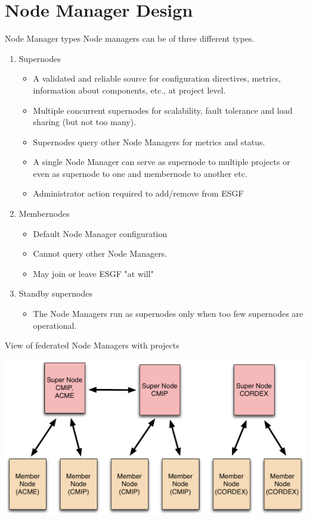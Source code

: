 \documentclass{beamer}
\begin{document}
\section{Node Manager Design}
\begin{frame}{Node Manager types}
Node managers can be of three different types.
\begin{enumerate}
\item Supernodes
\begin{itemize}
\item A validated and reliable source for configuration directives, metrics, information about components, etc., at project level.
\item Multiple concurrent supernodes for scalability, fault tolerance and load sharing (but not too many).
\item Supernodes query other Node Managers for metrics and status.
\item A single Node Manager can serve as supernode to multiple projects or even as supernode to one and membernode to another etc.
\item Administrator action required to add/remove from ESGF
\end{itemize}
\item Membernodes
\begin{itemize}
\item Default Node Manager configuration
\item Cannot query other Node Managers.
\item May join or leave ESGF "at will"
\end{itemize}
\item Standby supernodes
\begin{itemize}
\item The Node Managers run as supernodes only when too few supernodes are operational.
\end{itemize}
\end{enumerate}
\end{frame}




\begin{frame}{View of federated Node Managers with projects }
\begin{center}
\includegraphics[scale=0.35]{ESG-node-org.pdf}
\end{center}
\end{frame}
\end{document}
